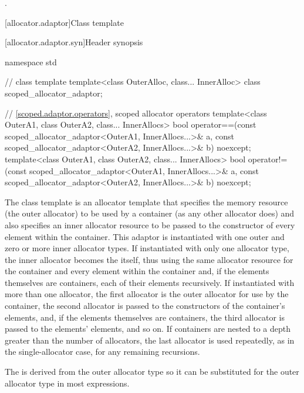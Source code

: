 \begin{itemdescr}
\pnum
\returns
{}.
\end{itemdescr}


[allocator.adaptor]{Class template }

[allocator.adaptor.syn]{Header  synopsis}

%
\begin{codeblock}
namespace std {
  // class template 
  template<class OuterAlloc, class... InnerAlloc>
    class scoped_allocator_adaptor;

  // \ref{scoped.adaptor.operators}, scoped allocator operators
  template<class OuterA1, class OuterA2, class... InnerAllocs>
    bool operator==(const scoped_allocator_adaptor<OuterA1, InnerAllocs...>& a,
                    const scoped_allocator_adaptor<OuterA2, InnerAllocs...>& b) noexcept;
  template<class OuterA1, class OuterA2, class... InnerAllocs>
    bool operator!=(const scoped_allocator_adaptor<OuterA1, InnerAllocs...>& a,
                    const scoped_allocator_adaptor<OuterA2, InnerAllocs...>& b) noexcept;
}
\end{codeblock}

\pnum
The class template  is an allocator template that
specifies the memory resource (the outer allocator) to be used by a container (as any
other allocator does) and also specifies an inner allocator resource to be passed to the
constructor of every element within the container. This adaptor is instantiated with one
outer and zero or more inner allocator types. If instantiated with only one allocator
type, the inner allocator becomes the  itself, thus
using the same allocator resource for the container and every element within the
container and, if the elements themselves are containers, each of their elements
recursively. If instantiated with more than one allocator, the first allocator is the
outer allocator for use by the container, the second allocator is passed to the
constructors of the container's elements, and, if the elements themselves are
containers, the third allocator is passed to the elements' elements, and so on. If
containers are nested to a depth greater than the number of allocators, the last
allocator is used repeatedly, as in the single-allocator case, for any remaining
recursions. \begin{note} The  is derived from the outer
allocator type so it can be substituted for the outer allocator type in most
expressions. \end{note}

